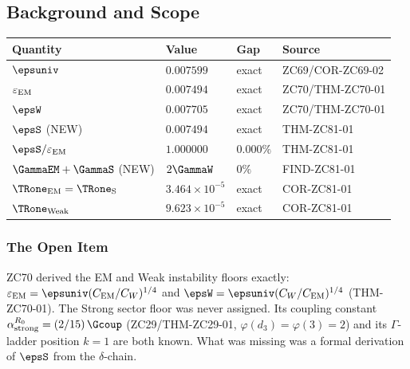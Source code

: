\documentclass[12pt, a4paper]{article}
\renewcommand{\epsEM}{\varepsilon_{\rm EM}}
\begin{document}
\subsection{Background and Scope}
\label{sec:background}

\begin{keybox}[title={Numerical Summary --- ZC81 (T-canonical, $R_0$)}]
{\small\renewcommand{\arraystretch}{1.25}
\begin{center}
\begin{tabular}{@{}p{4.8cm}p{2.2cm}p{2.0cm}p{3.0cm}@{}}
\toprule
\textbf{Quantity} & \textbf{Value} & \textbf{Gap} & \textbf{Source} \\
\midrule
$\epsuniv$                  & $0.007599$ & exact & ZC69/COR-ZC69-02 \\
$\epsEM$                    & $0.007494$ & exact & ZC70/THM-ZC70-01 \\
$\epsW$                     & $0.007705$ & exact & ZC70/THM-ZC70-01 \\
\midrule
$\epsS$ (NEW)               & $0.007494$ & exact & THM-ZC81-01 \\
$\epsS / \epsEM$            & $1.000000$ & $0.000\%$ & THM-ZC81-01 \\
$\GammaEM + \GammaS$ (NEW)  & $2\GammaW$ & $0\%$ & FIND-ZC81-01 \\
$\TRone_{\rm EM}=\TRone_{\rm S}$ & $3.464{\times}10^{-5}$ & exact & COR-ZC81-01 \\
$\TRone_{\rm Weak}$         & $9.623{\times}10^{-5}$ & exact & COR-ZC81-01 \\
\bottomrule
\end{tabular}
\end{center}}
\end{keybox}

\subsubsection{The Open Item}

ZC70 derived the EM and Weak instability floors exactly:
$\epsEM = \epsuniv(C_{\rm EM}/C_W)^{1/4}$ and
$\epsW = \epsuniv(C_W/C_{\rm EM})^{1/4}$
(THM-ZC70-01). The Strong sector floor was never assigned. Its
coupling constant $\alpha_{\rm strong}^{R_0} = (2/15)\,\Gcoup$
(ZC29/THM-ZC29-01, $\varphi(d_3) = \varphi(3) = 2$) and its
$\Gamma$-ladder position $k=1$ are both known. What was missing
was a formal derivation of $\epsS$ from the $\delta$-chain.
\end{document}
